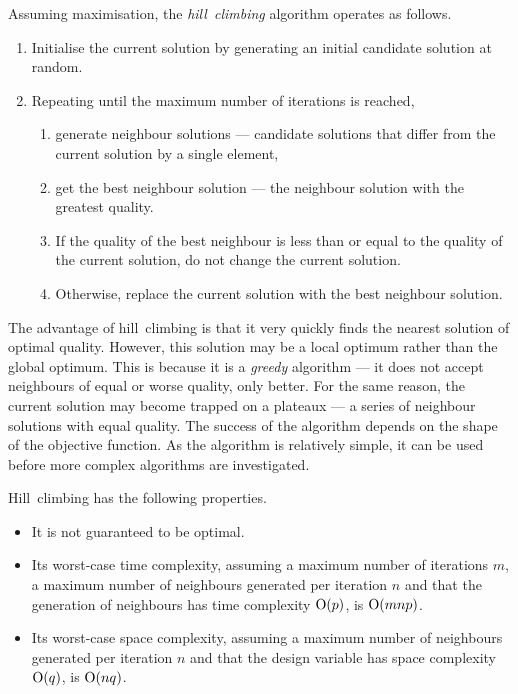 Assuming maximisation, the \emph{hill~climbing} algorithm operates as follows.
\begin{enumerate}
  \item Initialise the current solution by generating an initial candidate solution at random.
  \item Repeating until the maximum number of iterations is reached,
  \begin{enumerate}
    \item generate neighbour solutions --- candidate solutions that differ from the current solution by a single element,
    \item get the best neighbour solution --- the neighbour solution with the greatest quality.
    \item If the quality of the best neighbour is less than or equal to the quality of the current solution, do not change the current solution.
    \item Otherwise, replace the current solution with the best neighbour solution.
  \end{enumerate}
\end{enumerate}

The advantage of hill~climbing is that it very quickly finds the nearest solution of optimal quality.
However, this solution may be a local optimum rather than the global optimum.
This is because it is a \emph{greedy} algorithm --- it does not accept neighbours of equal or worse quality, only better.
For the same reason, the current solution may become trapped on a plateaux --- a series of neighbour solutions with equal quality.
The success of the algorithm depends on the shape of the objective function.
As the algorithm is relatively simple, it can be used before more complex algorithms are investigated.

Hill~climbing has the following properties.
\begin{itemize}
  \item It is not guaranteed to be optimal.
  \item Its worst-case time complexity, assuming a maximum number of iterations \( m \), a maximum number of neighbours generated per iteration \( n \) and that the generation of neighbours has time complexity \( \mathrm{O}\!\left( p \right) \), is \( \mathrm{O}\!\left( mnp \right) \).
  \item Its worst-case space complexity, assuming a maximum number of neighbours generated per iteration \( n \) and that the design variable has space complexity \( \mathrm{O}\!\left( q \right) \), is \( \mathrm{O}\!\left( nq \right) \).
\end{itemize}

